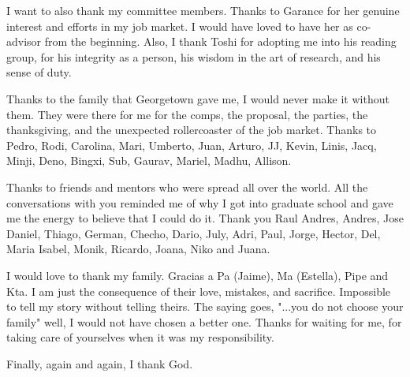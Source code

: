 \documentclass[12pt]{report}
\begin{document}
I want to also thank my committee members. Thanks to Garance for her genuine interest and efforts in my job market. I would have loved to have her as co-advisor from the beginning. Also, I thank Toshi for adopting me into his reading group, for his integrity as a person, his wisdom in the art of research, and his sense of duty. 

Thanks to the family that Georgetown gave me, I would never make it without them. They were there for me for the comps, the proposal, the parties, the thanksgiving, and the unexpected rollercoaster of the job market. Thanks to  Pedro, Rodi, Carolina, Mari, Umberto, Juan, Arturo, JJ, Kevin, Linis, Jacq, Minji, Deno, Bingxi, Sub, Gaurav, Mariel, Madhu, Allison.

Thanks to friends and mentors who were spread all over the world. All the conversations with you reminded me of why I got into graduate school and gave me the energy to believe that I could do it. Thank you Raul Andres, Andres, Jose Daniel, Thiago, German, Checho, Dario, July, Adri, Paul, Jorge, Hector, Del, Maria Isabel, Monik, Ricardo, Joana, Niko and Juana. 

I would love to thank my family. Gracias a Pa (Jaime), Ma (Estella), Pipe and Kta. I am just the consequence of their love, mistakes, and sacrifice. Impossible to tell my story without telling theirs. The saying goes, "...you do not choose your family" well, I would not have chosen a better one. Thanks for waiting for me, for taking care of yourselves when it was my responsibility. 

Finally, again and again, I thank God. 





\tableofcontents

\listoffigures  %
\listoftables   %

\newpage

\end{document}
